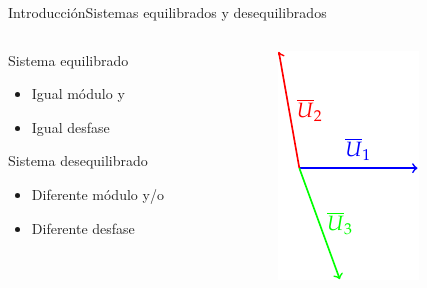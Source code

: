 \documentclass[aspectratio=169, xcolor={usenames,svgnames,dvipsnames}]{beamer}
\begin{document}
\begin{frame}{Introducción}{Sistemas equilibrados y desequilibrados}
\begin{columns}
\begin{column}{0.3\linewidth}
\alert{Sistema equilibrado}
\begin{itemize}
    \item Igual módulo \alert{y}
    \item Igual desfase
\end{itemize}

\vspace{5mm}
\alert{Sistema desequilibrado}
\begin{itemize}
    \item Diferente módulo \alert{y/o}
    \item Diferente desfase
\end{itemize}
\end{column}
\pause\begin{column}{0.3\linewidth}
\begin{center}
    \includegraphics[width=0.7\linewidth]{../figs/fasores_desq1.pdf}
\end{center}
\end{column}

\end{columns}
\end{frame}
\end{document}
